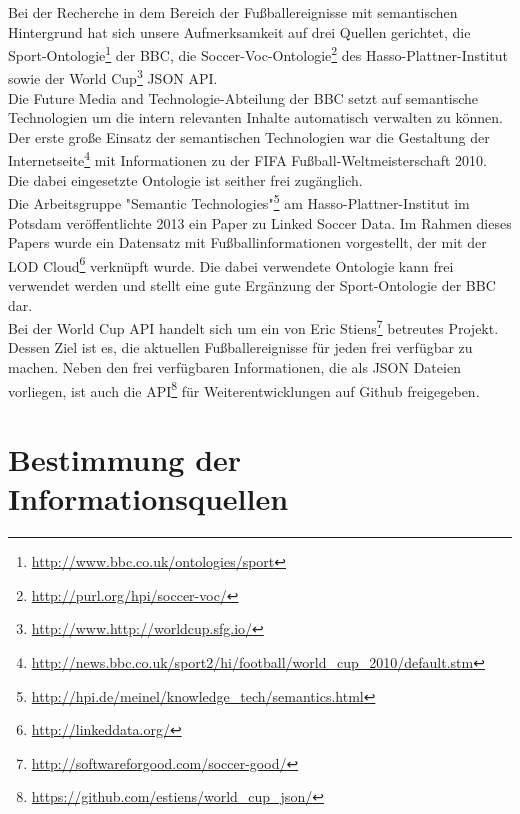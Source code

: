 \documentclass[runningheads,a4paper]{llncs}
\begin{document}
Bei der Recherche in dem Bereich der Fußballereignisse mit semantischen Hintergrund hat sich unsere Aufmerksamkeit auf drei Quellen gerichtet, die Sport-Ontologie\footnote{\url{http://www.bbc.co.uk/ontologies/sport}} der BBC, die Soccer-Voc-Ontologie\footnote{\url{http://purl.org/hpi/soccer-voc/}} des Hasso-Plattner-Institut sowie der World Cup\footnote{\url{http://www.http://worldcup.sfg.io/}} JSON API.\\ Die Future Media and Technologie-Abteilung der BBC setzt auf semantische Technologien um die intern relevanten Inhalte automatisch verwalten zu können. Der erste große Einsatz der semantischen Technologien war die Gestaltung der Internetseite\footnote{\url{http://news.bbc.co.uk/sport2/hi/football/world_cup_2010/default.stm}} mit Informationen zu der FIFA Fußball-Weltmeisterschaft 2010. Die dabei eingesetzte Ontologie ist seither frei zugänglich. \\
Die Arbeitsgruppe "Semantic Technologies"\footnote{\url{http://hpi.de/meinel/knowledge_tech/semantics.html}} am Hasso-Plattner-Institut im Potsdam veröffentlichte 2013 ein Paper zu Linked Soccer Data\cite{url_lsd}. Im Rahmen dieses Papers wurde ein Datensatz mit Fußballinformationen vorgestellt, der mit der LOD Cloud\footnote{\url{http://linkeddata.org/}} verknüpft wurde. Die dabei verwendete Ontologie kann frei verwendet werden und stellt eine gute Ergänzung der Sport-Ontologie der BBC dar.\\
Bei der World Cup API handelt sich um ein von Eric Stiens\footnote{\url{http://softwareforgood.com/soccer-good/}} betreutes Projekt. Dessen Ziel ist es, die aktuellen Fußballereignisse für jeden frei verfügbar zu machen. Neben den frei verfügbaren Informationen, die als JSON Dateien vorliegen, ist auch die API\footnote{\url{https://github.com/estiens/world_cup_json/}} für Weiterentwicklungen auf Github freigegeben. 


\section{Bestimmung der Informationsquellen}\label{infoQuell}
\end{document}
